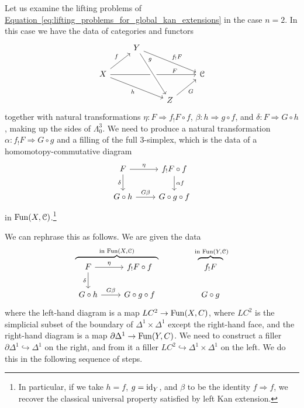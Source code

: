 \documentclass[main.tex]{subfiles}
\begin{document}
Let us examine the lifting problems of \hyperref[eq:lifting_problems_for_global_kan_extensions]{Equation~\ref*{eq:lifting_problems_for_global_kan_extensions}} in the case $n = 2$. In this case we have the data of categories and functors
\begin{equation*}
  \begin{tikzcd}
    & Y
    \arrow[drr, "f_{!}F"]
    \\
    X
    \arrow[drr, swap, "h"]
    \arrow[ur, "f"]
    \arrow[rrr, near end, "F"]
    &&& \category{C}
    \\
    && Z
    \arrow[ur, swap, "G"]
    \arrow[from=uul, crossing over, near start, "g"]
  \end{tikzcd}
\end{equation*}
together with natural transformations $\eta\colon F \Rightarrow f_{!}F \circ f$, $\beta\colon h \Rightarrow g \circ f$, and $\delta\colon F \Rightarrow G \circ h$, making up the sides of $\Lambda^{3}_{0}$. We need to produce a natural transformation $\alpha\colon f_{!}F \Rightarrow G \circ g$ and a filling of the full 3-simplex, which is the data of a homomotopy-commutative diagram
\begin{equation*}
  \begin{tikzcd}
    F
    \arrow[r, "\eta"]
    \arrow[d, swap, "\delta"]
    & f_{!}F \circ f
    \arrow[d, "\alpha f"]
    \\
    G \circ h
    \arrow[r, "G \beta"]
    & G \circ g \circ f
  \end{tikzcd}
\end{equation*}
in $\mathrm{Fun}(X, \mathcal{C})$.\footnote{In particular, if we take $h = f$, $g = \mathrm{id}_{Y}$, and $\beta$ to be the identity $f \Rightarrow f$, we recover the classical universal property satisfied by left Kan extension.}

We can rephrase this as follows. We are given the data
\begin{equation*}
  \overbrace{
  \begin{tikzcd}[ampersand replacement=\&]
    F
    \arrow[r, "\eta"]
    \arrow[d, swap, "\delta"]
    \& f_{!}F \circ f
    \\
    G \circ h
    \arrow[r, "G \beta"]
    \& G \circ g \circ f
  \end{tikzcd}}^{\text{in }\Fun(X, \category{C})}
  \qquad\qquad
  \overbrace{
  \begin{tikzcd}
    f_{!}F
    \\
    G \circ g
  \end{tikzcd}}^{\text{ in }\Fun(Y, \category{C})}
\end{equation*}
where the left-hand diagram is a map $LC^{2} \to \mathrm{Fun}(X, C)$, where $LC^{2}$ is the simplicial subset of the boundary of $\Delta^{1} \times \Delta^{1}$ except the right-hand face, and the right-hand diagram is a map $\partial \Delta^{1} \to \mathrm{Fun}(Y, C)$. We need to construct a filler $\partial \Delta^{1} \hookrightarrow \Delta^{1}$ on the right, and from it a filler $LC^{2} \hookrightarrow \Delta^{1} \times \Delta^{1}$ on the left. We do this in the following sequence of steps.
\end{document}
